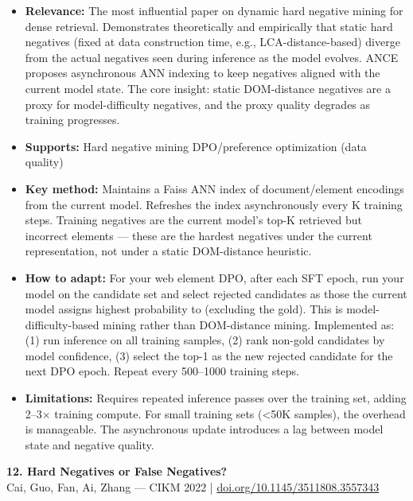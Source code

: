 \documentclass[pdflatex,sn-mathphys-num]{sn-jnl}
\theoremstyle{thmstyleone}
\theoremstyle{thmstyletwo}
\theoremstyle{thmstylethree}
\begin{document}
\begin{itemize}
    \item \textbf{Relevance:} The most influential paper on dynamic hard negative mining for dense retrieval. Demonstrates theoretically and empirically that static hard negatives (fixed at data construction time, e.g., LCA-distance-based) diverge from the actual negatives seen during inference as the model evolves. ANCE proposes asynchronous ANN indexing to keep negatives aligned with the current model state. The core insight: static DOM-distance negatives are a proxy for model-difficulty negatives, and the proxy quality degrades as training progresses.
    \item \textbf{Supports:} \checkmark Hard negative mining \checkmark DPO/preference optimization (data quality)
    \item \textbf{Key method:} Maintains a Faiss ANN index of document/element encodings from the current model. Refreshes the index asynchronously every K training steps. Training negatives are the current model's top-K retrieved but incorrect elements --- these are the hardest negatives under the current representation, not under a static DOM-distance heuristic.
    \item \textbf{How to adapt:} For your web element DPO, after each SFT epoch, run your model on the candidate set and select rejected candidates as those the current model assigns highest probability to (excluding the gold). This is model-difficulty-based mining rather than DOM-distance mining. Implemented as: (1) run inference on all training samples, (2) rank non-gold candidates by model confidence, (3) select the top-1 as the new rejected candidate for the next DPO epoch. Repeat every 500--1000 training steps.
    \item \textbf{Limitations:} Requires repeated inference passes over the training set, adding 2--3$\times$ training compute. For small training sets (<50K samples), the overhead is manageable. The asynchronous update introduces a lag between model state and negative quality.
\end{itemize}

\textbf{12. Hard Negatives or False Negatives?} \\
Cai, Guo, Fan, Ai, Zhang --- CIKM 2022 | \href{https://dl.acm.org/doi/10.1145/3511808.3557343}{doi.org/10.1145/3511808.3557343}
\end{document}
